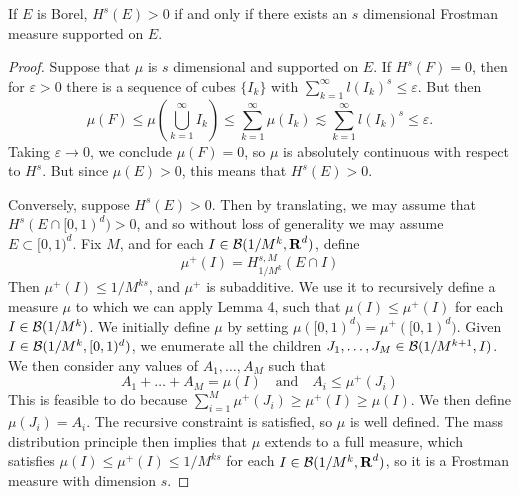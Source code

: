 
\begin{lemma}
	If $E$ is Borel, $H^s(E) > 0$ if and only if there exists an $s$ dimensional Frostman measure supported on $E$.
\end{lemma}
\begin{proof}
	Suppose that $\mu$ is $s$ dimensional and supported on $E$. If $H^s(F) = 0$, then for $\varepsilon > 0$ there is a sequence of cubes $\{ I_k \}$ with $\sum_{k = 1}^\infty l(I_k)^s \leq \varepsilon$. But then
	\[ \mu(F) \leq \mu \left( \bigcup_{k = 1}^\infty I_k \right) \leq \sum_{k = 1}^\infty \mu(I_k) \lesssim \sum_{k = 1}^\infty l(I_k)^s \leq \varepsilon. \]
	Taking $\varepsilon \to 0$, we conclude $\mu(F) = 0$, so $\mu$ is absolutely continuous with respect to $H^s$. But since $\mu(E) > 0$, this means that $H^s(E) > 0$.

	Conversely, suppose $H^s(E) > 0$. Then by translating, we may assume that $H^s(E \cap [0,1)^d) > 0$, and so without loss of generality we may assume $E \subset [0,1)^d$. Fix $M$, and for each $I \in \operatorname{\mathcal{B}}(1/M^k,\operatorname{\mathbf{R}}^d)$, define
	\[ \mu^+(I) = H^{s,M}_{1/M^k}(E \cap I) \]
	Then $\mu^+(I) \leq 1/M^{ks}$, and $\mu^+$ is subadditive. We use it to recursively define a measure $\mu$ to which we can apply Lemma 4, such that $\mu(I) \leq \mu^+(I)$ for each $I \in \operatorname{\mathcal{B}}(1/M^k)$. We initially define $\mu$ by setting $\mu([0,1)^d) = \mu^+([0,1)^d)$. Given $I \in \operatorname{\mathcal{B}}(1/M^k,[0,1)^d)$, we enumerate all the children $J_1, \dots, J_M \in \operatorname{\mathcal{B}}(1/M^{k+1},I)$. We then consider any values of $A_1, \dots, A_M$ such that
	\[ A_1 + \dots + A_M = \mu(I)\quad\text{and}\quad A_i \leq \mu^+(J_i) \]
	This is feasible to do because $\sum_{i = 1}^M \mu^+(J_i) \geq \mu^+(I) \geq \mu(I)$. We then define $\mu(J_i) = A_i$. The recursive constraint is satisfied, so $\mu$ is well defined. The mass distribution principle then implies that $\mu$ extends to a full measure, which satisfies $\mu(I) \leq \mu^+(I) \leq 1/M^{ks}$ for each $I \in \operatorname{\mathcal{B}}(1/M^k,\operatorname{\mathbf{R}}^d)$, so it is a Frostman measure with dimension $s$.
\end{proof}

